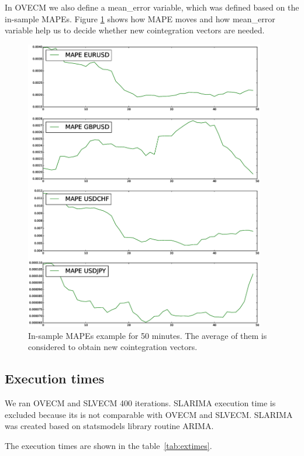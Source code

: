 In OVECM we also define a mean\_error variable, which was defined based on the
in-sample MAPEs. Figure \ref{fig:mapes} shows how MAPE moves and how mean\_error
variable help us to decide whether new cointegration vectors are needed.

\begin{figure}[!h]
  \centering
   \includegraphics[width = 10.5cm]{img/mapes} 
  \caption[In-sample MAPEs example for 50 minutes]{In-sample MAPEs example for 50 minutes. The average of them is
  considered to obtain new cointegration vectors.}
  \label{fig:mapes}
 \end{figure}



\subsection{Execution times} \label{sec:exectimes}
We ran OVECM and SLVECM 400 iterations. SLARIMA execution time is excluded
because its is not comparable with OVECM and SLVECM. SLARIMA was created based
on statsmodels library routine ARIMA.

The execution times are shown in the table~\ref{tab:extimes}.


